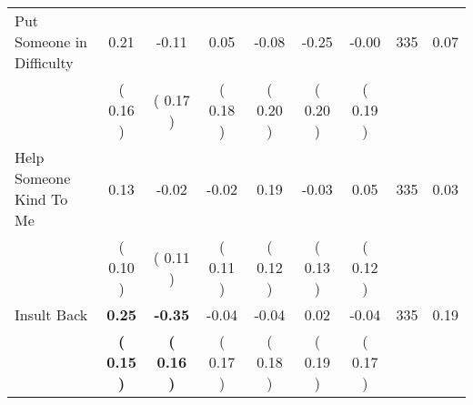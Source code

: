 \begin{tabular}{lcccccccc}
Put Someone in Difficulty &      0.21 &     -0.11 &      0.05 &     -0.08 &     -0.25 &     -0.00 & 335 &       0.07 \\ 
 & (     0.16 ) & (     0.17 ) & (     0.18 ) & (     0.20 ) & (     0.20 ) & (     0.19 ) & \\
Help Someone Kind To Me &      0.13 &     -0.02 &     -0.02 &      0.19 &     -0.03 &      0.05 & 335 &       0.03 \\ 
 & (     0.10 ) & (     0.11 ) & (     0.11 ) & (     0.12 ) & (     0.13 ) & (     0.12 ) & \\
Insult Back & \textbf{     0.25} & \textbf{    -0.35} &     -0.04 &     -0.04 &      0.02 &     -0.04 & 335 &       0.19 \\ 
 & \textbf{(     0.15 )} & \textbf{(     0.16 )} & (     0.17 ) & (     0.18 ) & (     0.19 ) & (     0.17 ) & \\
\bottomrule
\end{tabular}
